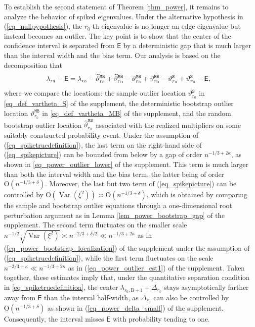 \documentclass[12pt]{article}
\theoremstyle{plain}
\numberwithin{equation}{section}
\begin{document}
To establish the second statement of Theorem \ref{thm_power}, it remains to analyze the behavior of spiked eigenvalues. Under the alternative hypothesis in (\ref{eq_nullpypothesis}), the $r_0$-th eigenvalue is no longer an edge eigenvalue but instead becomes an outlier. The key point is to show that the center of the confidence interval is separated from $\mathsf E$ by a deterministic gap that is much larger than the interval width and the bias term. Our analysis is based on the decomposition that  \vspace*{-10pt}
\begin{equation}\label{eq_spikepicture}
	\vspace*{-10pt}
	\lambda_{r_0}-\mathsf{E}=\lambda_{r_0}-\widehat{\vartheta}^{\mathtt{MB}}_{r_0}+\widehat{\vartheta}^{\mathtt{MB}}_{r_0}-\vartheta^{\mathtt{MB}}_{r_0}+\vartheta^{\mathtt{MB}}_{r_0}-\vartheta_{r_0}^{\mathtt S}+\vartheta_{r_0}^{\mathtt S}-\mathsf{E},
\end{equation}
where we compare the locations: the sample outlier location $\vartheta_{r_0}^{\mathtt S}$ in \eqref{eq_def_vartheta_S} of the supplement, the deterministic bootstrap outlier location $\vartheta_{r_0}^{\mathtt{MB}}$ in \eqref{eq_def_vartheta_MB} of the supplement, and the random bootstrap outlier location $\widehat{\vartheta}_{r_0}^{\mathtt{MB}}$ associated with the realized multipliers on some suitably constructed probability event. Under the assumption of (\ref{eq_spiketruedefinition}), the last term on the right-hand side of (\ref{eq_spikepicture}) can be bounded from below by a gap of order $ n^{-1/3+2\kappa}$, as shown in \eqref{eq_power_outlier_lower} of the supplement. This term is much larger than both the interval width and the bias term, the latter being of order $\mathrm{O}(n^{-1/3+\delta})$. Moreover, the last but two term of (\ref{eq_spikepicture}) can be controlled by $\mathrm O(\operatorname{Var}(\xi^2)) \asymp \mathrm O(n^{-1/3+\delta}) $, which is obtained by comparing the sample and bootstrap outlier equations through a one-dimensional root perturbation argument as in Lemma \ref{lem_power_bootstrap_gap} of the supplement. The second term fluctuates on the smaller scale $n^{-1/2}\sqrt{\operatorname{Var}(\xi^2)} \asymp n^{-2/3+\delta/2} \ll n^{-1/3+2 \kappa}$ as in (\ref{eq_power_bootstrap_localization}) of the supplement under the assumption of (\ref{eq_spiketruedefinition}), while the first term fluctuates on the scale $ n^{-2/3+\kappa} \ll n^{-1/3+2\kappa}$ as in (\ref{eq_power_outlier_est1}) of the supplement. Taken together, these estimates imply that, under the quantitative separation condition in \eqref{eq_spiketruedefinition}, the center $\lambda_{r_0,\mathrm{B}+1}+\Delta_{r_0}$ stays asymptotically farther away from $\mathsf E$ than the interval half-width, as $\Delta_{r_0}$ can also be controlled by $\mathrm{O}(n^{-1/3+\delta})$ as shown in (\ref{eq_power_delta_small}) of the supplement. Consequently, the interval misses $\mathsf E$ with probability tending to one.
\end{document}
